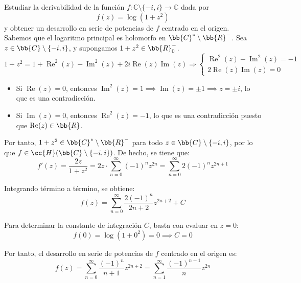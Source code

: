 \documentclass[12pt]{article}
\renewcommand{\Re}{\operatorname{Re}} %
\renewcommand{\Im}{\operatorname{Im}}
\begin{document}
    \begin{ejercicio}[3.5 puntos]
        Estudiar la derivabilidad de la función $f : \mathbb{C} \setminus \{-i, i\} \to \mathbb{C}$ dada por
        \[
            f(z) = \log(1 + z^2)
        \]
        y obtener un desarrollo en serie de potencias de $f$ centrado en el origen.\\

        Sabemos que el logaritmo principal es holomorfo en $\bb{C}^*\setminus \bb{R}^-$. Sea $z\in \bb{C}\setminus \{-i,i\}$, y supongamos $1+z^2\in \bb{R}_0^-$.
        \begin{equation*}
            1+ z^2 = 1+\Re^2(z) - \Im^2(z) + 2i\Re(z)\Im(z)\Longrightarrow
            \left\{
            \begin{array}{l}
                \Re^2(z) - \Im^2(z) = -1 \\
                2\Re(z)\Im(z) = 0
            \end{array}
            \right.
        \end{equation*}
        \begin{itemize}
            \item Si $\Re(z)=0$, entonces $\Im^2(z) = 1\implies \Im(z) = \pm 1\implies z = \pm i$, lo que es una contradicción.
            \item Si $\Im(z)=0$, entonces $\Re^2(z) = -1$, lo que es una contradicción puesto que $\Re(z)\in \bb{R}$.
        \end{itemize}
        Por tanto, $1+z^2\in \bb{C}^*\setminus \bb{R}^-$ para todo $z\in \bb{C}\setminus \{-i,i\}$, por lo que $f\in \cc{H}(\bb{C}\setminus \{-i,i\})$.
        De hecho, se tiene que:
        \begin{equation*}
            f'(z) = \frac{2z}{1+z^2}
            = 2z\cdot \sum_{n=0}^{\infty} (-1)^n z^{2n}
            = \sum_{n=0}^{\infty} 2(-1)^n z^{2n+1}
        \end{equation*}

        Integrando término a término, se obtiene:
        \begin{equation*}
            f(z) = \sum_{n=0}^{\infty} \frac{2(-1)^n}{2n+2} z^{2n+2} + C
        \end{equation*}

        Para determinar la constante de integración $C$, basta con evaluar en $z=0$:
        \begin{equation*}
            f(0) = \log(1+0^2) = 0
            \implies C = 0
        \end{equation*}

        Por tanto, el desarrollo en serie de potencias de $f$ centrado en el origen es:
        \begin{equation*}
            f(z) = \sum_{n=0}^{\infty} \frac{(-1)^n}{n+1} z^{2n+2}
            = \sum_{n=1}^{\infty} \frac{(-1)^{n-1}}{n} z^{2n}
        \end{equation*}
    \end{ejercicio}
\end{document}
